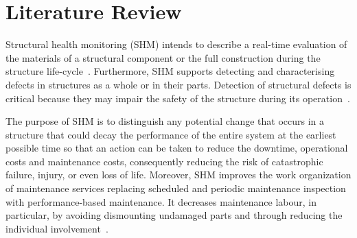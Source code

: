 \chapter[Literature Review]{Literature Review}
\label{ch2}
Structural health monitoring (SHM) intends to describe a real-time evaluation 
of the materials of a structural component or the full construction during the structure life-cycle~\cite{Balageas2010}. 
Furthermore, SHM supports detecting and characterising defects in structures 
as a whole or in their parts.
Detection of structural defects is critical because they may impair the safety of the structure during its operation~\cite{Yuan2016}. 

The purpose of SHM is to distinguish any potential change that occurs in a structure that could decay the performance of the entire system at the earliest possible time so that an action can be taken to reduce the downtime, operational costs and maintenance costs, consequently reducing the risk of 
catastrophic failure, injury, or even loss of life.
Moreover, SHM improves the work organization of maintenance services replacing scheduled and periodic maintenance inspection with performance-based maintenance.
It decreases maintenance labour, in particular, by avoiding dismounting undamaged parts and through reducing the individual involvement~\cite{Balageas2010}.

